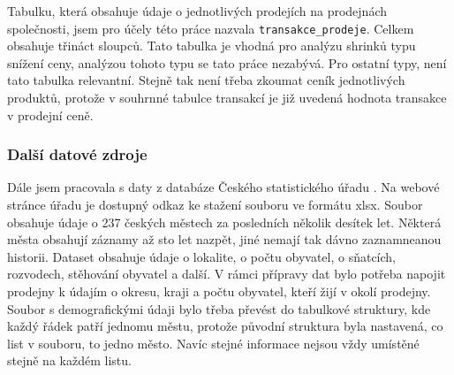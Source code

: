 Tabulku, která obsahuje údaje o jednotlivých prodejích na prodejnách společnosti, jsem pro účely této práce nazvala \texttt{transakce\_prodeje}. Celkem obsahuje třináct sloupců. Tato tabulka je vhodná pro analýzu shrinků typu snížení ceny, analýzou tohoto typu se tato práce nezabývá. Pro ostatní typy, není tato tabulka relevantní. Stejně tak není třeba zkoumat ceník jednotlivých produktů, protože v souhrnné tabulce transakcí je již uvedená hodnota transakce v prodejní ceně.

\subsubsection{Další datové zdroje}

Dále jsem pracovala s daty z databáze Českého statistického úřadu \cite{bib:czso}. Na webové stránce úřadu je dostupný odkaz ke stažení souboru ve formátu xlsx. Soubor obsahuje údaje o 237 českých městech za posledních několik desítek let. Některá města obsahují záznamy až sto let nazpět, jiné nemají tak dávno zaznamneanou historii. Dataset obsahuje údaje o lokalite, o počtu obyvatel, o sňatcích, rozvodech, stěhování obyvatel a další. V rámci přípravy dat bylo potřeba napojit prodejny k údajím o okresu, kraji a počtu obyvatel, kteří žijí v okolí prodejny. Soubor s demografickými údaji bylo třeba převést do tabulkové struktury, kde každý řádek patří jednomu městu, protože původní struktura byla nastavená, co list v souboru, to jedno město. Navíc stejné informace nejsou vždy umístěné stejně na každém listu. 



% 





